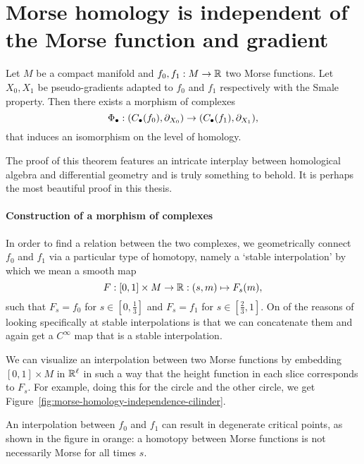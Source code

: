 \section{Morse homology is independent of the Morse function and gradient}
\begin{theorem}
    Let $M$ be a compact manifold and $ f_0, f_1: M \to  \mathbb{R}$ two Morse functions.
    Let $X_0, X_1$ be pseudo-gradients adapted to $f_0$ and $ f_1$ respectively with the Smale property.
    Then there exists a morphism of complexes
    \[
        \Phi_{\bullet}:
        (C_\bullet(f_0), \partial_{X_0}) \to  
        (C_\bullet(f_1), \partial_{X_1})
    ,\] 
    that induces an isomorphism on the level of homology.
\end{theorem}
    
\begin{myproof}
The proof of this theorem features an intricate interplay between homological algebra and differential geometry and is truly something to behold. It is perhaps the most beautiful proof in this thesis.
\paragraph{Construction of a morphism of complexes}
In order to find a relation between the two complexes, we geometrically connect $f_0$ and $f_1$ via a particular type of homotopy, namely  a `stable interpolation' by which we mean a smooth map
\[
    F: [0,1] \times M \to \mathbb{R}: (s, m) \mapsto F_s(m)
,\] 
such that $F_s = f_0$ for $s \in \left[0, \frac{1}{3}\right]$ and $F_s = f_1$ for $s \in \left[\frac{2}{3}, 1\right]$.
On of the reasons of looking specifically at stable interpolations is that we can concatenate them and again get a $C^{\infty}$ map that is a stable interpolation.

We can visualize an interpolation between two Morse functions by embedding $[0,1] \times M$ in $\mathbb{R}^{\ell}$ in such a way that the height function in each slice corresponds to $F_s$.
For example, doing this for the circle and the other circle, we get Figure~\ref{fig:morse-homology-independence-cilinder}.

\begin{marginfigure}
    \centering
    \caption{An interpolation between $f_0$ and $f_1$ can result in degenerate critical points, as shown in the figure in orange:
        a homotopy between Morse functions is not necessarily Morse for all times $s$.
    }
    \label{fig:morse-homology-independence-cilinder}
\end{marginfigure}


\end{myproof}
